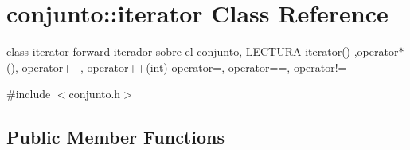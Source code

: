 \hypertarget{classconjunto_1_1iterator}{}\section{conjunto\+:\+:iterator Class Reference}
\label{classconjunto_1_1iterator}


class iterator forward iterador sobre el conjunto, L\+E\+C\+T\+U\+R\+A iterator() ,operator$\ast$(), operator++, operator++(int) operator=, operator==, operator!=  




{\ttfamily \#include $<$conjunto.\+h$>$}

\subsection*{Public Member Functions}
